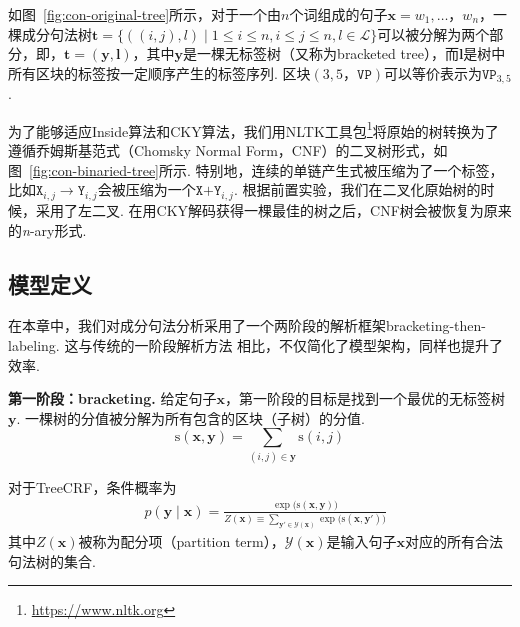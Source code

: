 如图~\ref{fig:con-original-tree}所示，对于一个由$n$个词组成的句子$\boldsymbol{x}=w_1,\dots，w_{n}$，一棵成分句法树$\boldsymbol{t}=\{((i, j),l)\mid 1\le i \le n,i \le j \le n,l \in \mathcal{L}\}$可以被分解为两个部分，即，$\boldsymbol{t}=(\boldsymbol{y}, \boldsymbol{l})$，其中$\boldsymbol{y}$是一棵无标签树（又称为bracketed tree），而$\boldsymbol{l}$是树中所有区块的标签按一定顺序产生的标签序列.
区块$(3,5，\texttt{VP})$可以等价表示为$\texttt{VP}_{3,5}$.

为了能够适应Inside算法和CKY算法，我们用NLTK工具包\footnote{\url{https://www.nltk.org}}将原始的树转换为了遵循乔姆斯基范式（Chomsky Normal Form，CNF）的二叉树形式，如图~\ref{fig:con-binaried-tree}所示.
特别地，连续的单链产生式被压缩为了一个标签，比如$\texttt{X}_{i,j} \rightarrow \texttt{Y}_{i,j}$会被压缩为一个$\texttt{X+Y}_{i,j}$.
根据前置实验，我们在二叉化原始树的时候，采用了左二叉.
在用CKY解码获得一棵最佳的树之后，CNF树会被恢复为原来的\textit{n}-ary形式.

\subsection{模型定义}\label{sub@sec:con-crf-model-definition}

在本章中，我们对成分句法分析采用了一个两阶段的解析框架bracketing-then-labeling.
这与传统的一阶段解析方法 \citep{stern-etal-2017-minimal,gaddy-etal-2018-whats}相比，不仅简化了模型架构，同样也提升了效率.

\noindent\textbf{第一阶段：bracketing.}
给定句子$\boldsymbol{x}$，第一阶段的目标是找到一个最优的无标签树$\boldsymbol{y}$.
一棵树的分值被分解为所有包含的区块（子树）的分值.
\begin{equation} \label{eq:tree-score}
  \mathrm{s}(\boldsymbol{x},\boldsymbol{y}) = \sum\limits_{(i,j)\in \boldsymbol{y}}\mathrm{s}(i,j)
\end{equation}

对于TreeCRF，条件概率为
\begin{equation}\label{eq:tree-prob}
  \begin{split}
    & p(\boldsymbol{y}\mid\boldsymbol{x})  = \frac{\exp({\mathrm{s}(\boldsymbol{x},\boldsymbol{y}))}}{Z(\boldsymbol{x}) \equiv \sum\limits_{\boldsymbol{y'} \in \mathcal{Y}(\boldsymbol{x})} {\exp({\mathrm{s}(\boldsymbol{x},\boldsymbol{y'}))}}}
  \end{split}
\end{equation}
其中$Z(\boldsymbol{x})$被称为配分项（partition term），$\mathcal{Y}(\boldsymbol{x})$是输入句子$\boldsymbol{x}$对应的所有合法句法树的集合.


